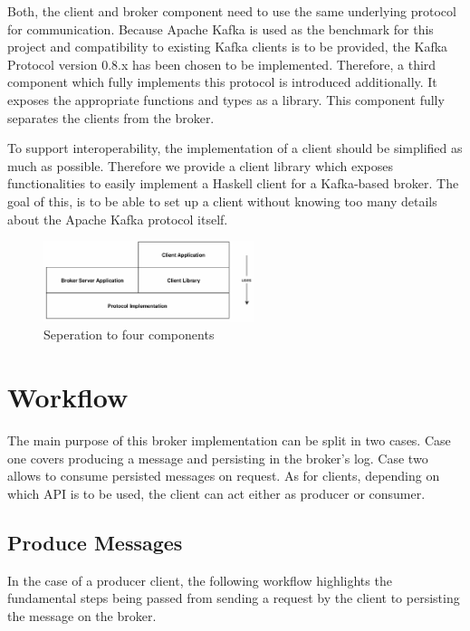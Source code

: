 Both, the client and broker component need to use the same underlying protocol
for communication. Because Apache Kafka is used as the benchmark for this project
and compatibility to existing Kafka clients is to be provided, the Kafka
Protocol version 0.8.x has been chosen to be implemented. Therefore, a third
component which fully implements this protocol is introduced additionally. It
exposes the appropriate functions and types as a library. This component fully
separates the clients from the broker. 

To support interoperability, the implementation of a client should be simplified
as much as possible. Therefore we provide a client library which exposes functionalities to
easily implement a Haskell client for a Kafka-based broker. The goal of this, is to be able to
set up a client without knowing too many details about the Apache Kafka protocol
itself.

\begin{figure}[H]
    \centering
    \includegraphics[width=0.55\textwidth]{images/architecture-components.png}
    \caption{Seperation to four components}
    \label{fig:architecture-components.png}
\end{figure}

\section{Workflow}

The main purpose of this broker implementation can be split in two cases. Case
one covers producing a message and persisting in the broker's log. Case two
allows to consume persisted messages on request. As for clients, depending on
which API is to be used, the client can act either as producer or consumer.

\subsection{Produce Messages}

In the case of a producer client, the following workflow highlights the
fundamental steps being passed from sending a request by the client to
persisting the message on the broker.

